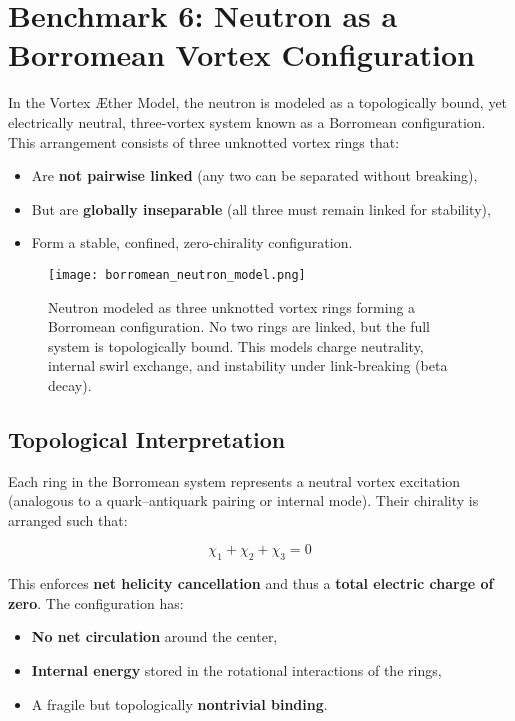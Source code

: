 \section{Benchmark 6: Neutron as a Borromean Vortex Configuration}

In the Vortex Æther Model, the neutron is modeled as a topologically bound, yet electrically neutral, three-vortex system known as a Borromean configuration. This arrangement consists of three unknotted vortex rings that:

\begin{itemize}
    \item Are \textbf{not pairwise linked} (any two can be separated without breaking),
    \item But are \textbf{globally inseparable} (all three must remain linked for stability),
    \item Form a stable, confined, zero-chirality configuration.
\end{itemize}

\begin{figure}[H]
    \centering
    \texttt{[image: borromean\_neutron\_model.png]}
    \caption{Neutron modeled as three unknotted vortex rings forming a Borromean configuration. No two rings are linked, but the full system is topologically bound. This models charge neutrality, internal swirl exchange, and instability under link-breaking (beta decay).}
\end{figure}

\subsection{Topological Interpretation}

Each ring in the Borromean system represents a neutral vortex excitation (analogous to a quark–antiquark pairing or internal mode). Their chirality is arranged such that:

\[
\chi_1 + \chi_2 + \chi_3 = 0
\]

This enforces \textbf{net helicity cancellation} and thus a \textbf{total electric charge of zero}. The configuration has:

\begin{itemize}
    \item \textbf{No net circulation} around the center,
    \item \textbf{Internal energy} stored in the rotational interactions of the rings,
    \item A fragile but topologically \textbf{nontrivial binding}.
\end{itemize}

